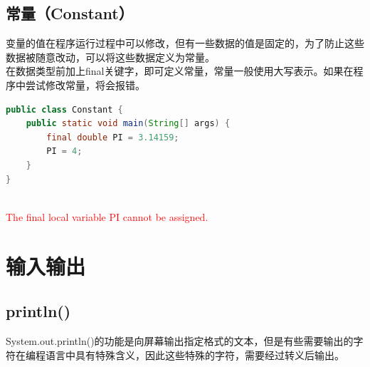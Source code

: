 \vspace{0.5cm}

\subsection{常量（Constant）}

变量的值在程序运行过程中可以修改，但有一些数据的值是固定的，为了防止这些数据被随意改动，可以将这些数据定义为常量。\\

在数据类型前加上final关键字，即可定义常量，常量一般使用大写表示。如果在程序中尝试修改常量，将会报错。\\


\begin{lstlisting}[language=Java]
public class Constant {
	public static void main(String[] args) {
		final double PI = 3.14159;
		PI = 4;
	}
}
\end{lstlisting}

\begin{tcolorbox}
	\\
	\textcolor{red}{The final local variable PI cannot be assigned.}
\end{tcolorbox}

\newpage

\section{输入输出}

\subsection{println()}

System.out.println()的功能是向屏幕输出指定格式的文本，但是有些需要输出的字符在编程语言中具有特殊含义，因此这些特殊的字符，需要经过转义后输出。\\

\begin{table}[H]
	\centering
	\caption{转义字符}
\end{table}

